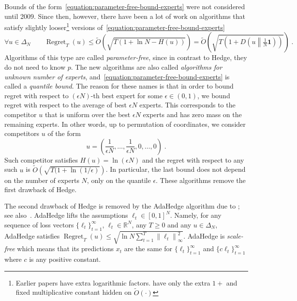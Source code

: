 \documentclass{colt2016} %
\DeclareMathOperator{\Regret}{Regret}
\newcommand{\R}{\mathbb{R}}     %
\newcommand{\KL}[2]{D\left({#1}\middle\|{#2}\right)}  %
\newcommand{\norm}[1]{\left\|{#1}\right\|}
\newcommand{\indicator}{\mathbf{1}}
\begin{document}
Bounds of the form~\eqref{equation:parameter-free-bound-experts} were not
considered until 2009. Since then, however, there have been a lot of work
\citep{Chaudhuri-Freund-Hsu-2009, Chernov-Vovk-2010, Koolen-van-Erven-2015,
Luo-Schapire-2015, Foster-Rakhlin-Sridharan-2015,
Orabona-Pal-2016-parameter-free} on algorithms that satisfy slightly
looser\footnote{Earlier papers have extra logarithmic factors. \citet{Foster-Rakhlin-Sridharan-2015,
Orabona-Pal-2016-parameter-free}
have only the extra $1+$ and fixed multiplicative constant hidden on
$\widetilde O(\cdot)$} versions
of~\eqref{equation:parameter-free-bound-experts}
\begin{equation}
\label{equation:parameter-free-bound-experts-2}
\forall u \in \Delta_N \qquad \Regret_T(u) \le \widetilde O(\sqrt{T (1 + \ln N - H(u))}) = \widetilde O\left(\sqrt{T(1 + \KL{u}{\tfrac{1}{N}\indicator} )} \right) \; .
\end{equation}
Algorithms of this type are called \emph{parameter-free}, since in contrast to
Hedge, they do not need to know $p$.  The new algorithms are also called
\emph{algorithms for unknown number of experts},
and~\eqref{equation:parameter-free-bound-experts} is called a
\emph{quantile bound}. The reason for these names is that in order to bound
regret with respect to $(\epsilon N)$-th best expert for some $\epsilon \in (0,1)$,
we bound regret with respect to the average of best $\epsilon N$ experts.
This corresponds to the competitor $u$ that is uniform over the best $\epsilon
N$ experts and has zero mass on the remaining experts.  In other words, up to
permutation of coordinates, we consider competitors $u$ of the form
$$
u = \left( \frac{1}{\epsilon N}, \dots, \frac{1}{\epsilon N}, 0, \dots, 0 \right) \; .
$$
Such competitor satisfies $H(u) = \ln (\epsilon N)$ and the regret with respect to
any such $u$ is $\widetilde O(\sqrt{T (1 + \ln(1/\epsilon)})$. In particular,
the last bound does not depend on the number of experts $N$, only on the
quantile $\epsilon$.  These algorithms remove the first drawback of Hedge.

The second drawback of Hedge is removed by the AdaHedge algorithm due to
\cite{de-Rooij-van-Erven-Grunwald-Koolen-2014}; see
also~\citep{Orabona-Pal-2016-parameter-free}. AdaHedge lifts the assumptions
$\ell_t \in [0,1]^N$. Namely, for any sequence of loss vectors
$\{\ell_t\}_{t=1}^\infty$, $\ell_t \in \R^N$, any $T \ge 0$ and any $u \in
\Delta_N$, AdaHedge satisfies $\Regret_T(u) \le \sqrt{\ln N \sum_{t=1}^T
\norm{\ell_t}_\infty^2}$. AdaHedge is \emph{scale-free} which means that its
predictions $x_t$ are the same for $\{\ell_t\}_{t=1}^\infty$ and $\{c
\ell_t\}_{t=1}^\infty$ where $c$ is any positive constant.
\end{document}
